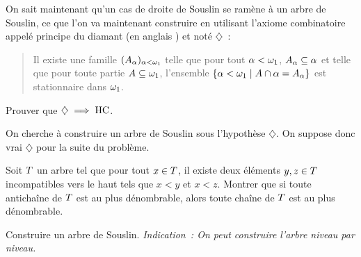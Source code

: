 \begin{problem}
  On sait maintenant qu'un cas de droite de Souslin se ramène à un arbre de
  Souslin, ce que l'on va maintenant construire en utilisant l'axiome
  combinatoire appelé principe du diamant (en anglais ) et noté $\diamondsuit$~:
  \begin{quotation}
    \noindent
    Il existe une famille $(A_{\alpha})_{\alpha < \omega_1}$ telle que pour tout
    $\alpha < \omega_1$, $A_{\alpha}\subseteq \alpha$ et telle que pour toute
    partie $A\subseteq \omega_1$, l'ensemble
    $\left\{ \alpha < \omega_1 \;\middle\vert\; A\cap \alpha = A_{\alpha} \right\}$ est
    stationnaire dans $\omega_1$.
  \end{quotation}
  \begin{pbQuest}
  \item Prouver que $\diamondsuit\implies\operatorname{HC}$.
  \end{pbQuest}
  On cherche à construire un arbre de Souslin sous l'hypothèse $\diamondsuit$.
  On suppose donc vrai $\diamondsuit$ pour la suite du problème.
  \begin{pbQuest}[resume]
  \item Soit $T$ un arbre tel que pour tout $x \in T$, il existe
    deux éléments $y,z \in T$ incompatibles vers le haut tels que $x < y$
    et $x < z$. Montrer que si toute antichaîne de $T$ est au plus
    dénombrable, alors toute chaîne de $T$ est au plus dénombrable.
  \item Construire un arbre de Souslin. \textit{Indication~: On peut construire
    l'arbre niveau par niveau.}
  \end{pbQuest}
\end{problem}
